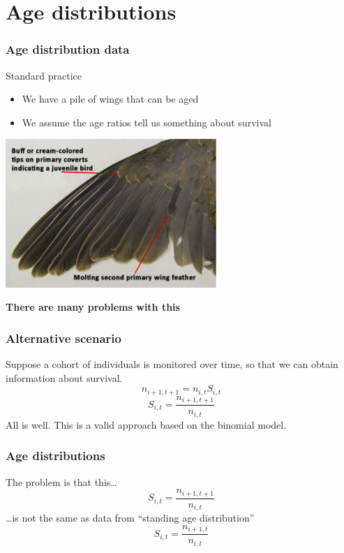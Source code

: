 \documentclass[color=usenames,dvipsnames]{beamer}\usepackage[]{graphicx}\usepackage[]{color}
\begin{document}
\section{Age distributions}



\begin{frame}
  \frametitle{Age distribution data}
  {%
    Standard practice}
  \begin{itemize}
    \item We have a pile of wings that can be aged \\
    \item We assume the age ratios tell us something about survival
  \end{itemize}
  \begin{center}
    \includegraphics[width=0.6\textwidth]{figs/dove_wing}
  \end{center}
  \pause
  {\centering \alert{\bf There are many problems with this} \par}
\end{frame}





\begin{frame}
  \frametitle{Alternative scenario}
  Suppose a cohort of individuals is monitored over time, so that we
  can obtain information about survival.
  \Large
\[
  n_{i+1,t+1} = n_{i,t}S_{i,t}
\]
\pause
\[
  S_{i,t} = \frac{n_{i+1,t+1}}{n_{i,t}}
\]
\normalsize
\pause
\vfill
\centering %
  All is well. This is a valid approach based on the
  binomial model. \\
\end{frame}



\begin{frame}
  \frametitle{Age distributions}
  \large
  The problem is that this\dots
  \Large
\[
  S_{i,t} = \frac{n_{i+1,t+1}}{n_{i,t}}
\]
  \pause
  \large
  \dots is not the same as data from ``standing age distribution''
  \Large
\[
  S_{i,t} = \frac{n_{i+1,t}}{n_{i,t}}
\]
\end{frame}
\end{document}
